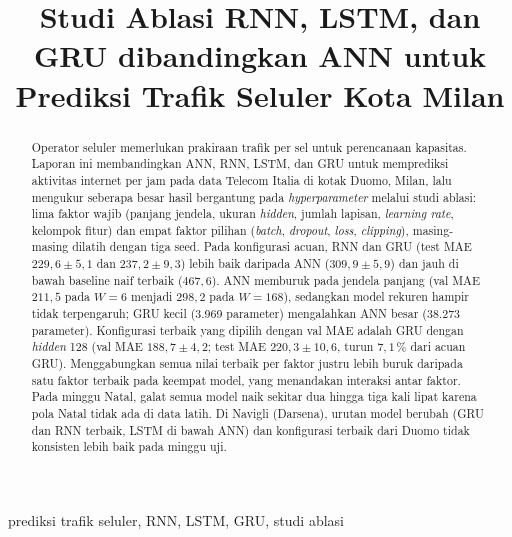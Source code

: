 \documentclass[conference,a4paper]{IEEEtran}
\begin{document}
\title{Studi Ablasi RNN, LSTM, dan GRU dibandingkan ANN untuk Prediksi Trafik Seluler Kota Milan}

\author{
}

\maketitle

\begin{abstract}
Operator seluler memerlukan prakiraan trafik per sel untuk perencanaan kapasitas. Laporan ini membandingkan ANN, RNN, LSTM, dan GRU untuk memprediksi aktivitas internet per jam pada data Telecom Italia di kotak Duomo, Milan, lalu mengukur seberapa besar hasil bergantung pada \textit{hyperparameter} melalui studi ablasi: lima faktor wajib (panjang jendela, ukuran \textit{hidden}, jumlah lapisan, \textit{learning rate}, kelompok fitur) dan empat faktor pilihan (\textit{batch}, \textit{dropout}, \textit{loss}, \textit{clipping}), masing-masing dilatih dengan tiga seed. Pada konfigurasi acuan, RNN dan GRU (test MAE $229{,}6 \pm 5{,}1$ dan $237{,}2 \pm 9{,}3$) lebih baik daripada ANN ($309{,}9 \pm 5{,}9$) dan jauh di bawah baseline naif terbaik ($467{,}6$). ANN memburuk pada jendela panjang (val MAE $211{,}5$ pada $W=6$ menjadi $298{,}2$ pada $W=168$), sedangkan model rekuren hampir tidak terpengaruh; GRU kecil (3.969 parameter) mengalahkan ANN besar (38.273 parameter). Konfigurasi terbaik yang dipilih dengan val MAE adalah GRU dengan \textit{hidden} 128 (val MAE $188{,}7 \pm 4{,}2$; test MAE $220{,}3 \pm 10{,}6$, turun $7{,}1$\,\% dari acuan GRU). Menggabungkan semua nilai terbaik per faktor justru lebih buruk daripada satu faktor terbaik pada keempat model, yang menandakan interaksi antar faktor. Pada minggu Natal, galat semua model naik sekitar dua hingga tiga kali lipat karena pola Natal tidak ada di data latih. Di Navigli (Darsena), urutan model berubah (GRU dan RNN terbaik, LSTM di bawah ANN) dan konfigurasi terbaik dari Duomo tidak konsisten lebih baik pada minggu uji.
\end{abstract}

\begin{IEEEkeywords}
prediksi trafik seluler, RNN, LSTM, GRU, studi ablasi
\end{IEEEkeywords}

\end{document}
